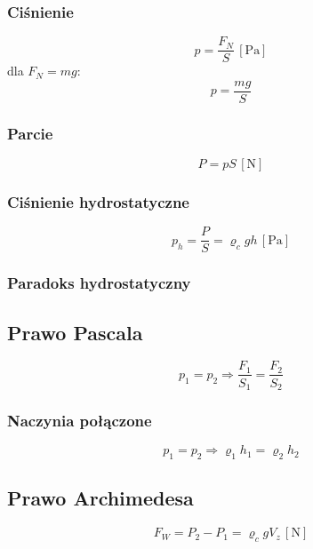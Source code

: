 \documentclass{article}
\numberwithin{equation}{section}
\newcommand{\unit}[1]{\, \left[\mathrm{#1}\right]}
\begin{document}
      \subsubsection{Ciśnienie}
        \begin{equation}
          p = \frac{F_N}{S} \unit{Pa}
        \end{equation}
        dla $F_N = mg$:
        \begin{equation}
          p = \frac{mg}{S}
        \end{equation}
      \subsubsection{Parcie}
        \begin{equation}
          P = pS \unit{N}
        \end{equation}
      \subsubsection{Ciśnienie hydrostatyczne}
        \begin{equation}
          p_h = \frac{P}{S} = \varrho_cgh \unit{Pa}
        \end{equation}
      \subsubsection{Paradoks hydrostatyczny}
    \subsection{Prawo Pascala}
      \begin{equation}
        p_1 = p_2 \Rightarrow \frac{F_1}{S_1} = \frac{F_2}{S_2}
      \end{equation}
      \subsubsection{Naczynia połączone}
        \begin{equation}
          p_1 = p_2 \Rightarrow \varrho_1h_1 = \varrho_2h_2
        \end{equation}
    \subsection{Prawo Archimedesa}
      \begin{equation}
        F_W = P_2 - P_1 = \varrho_cgV_z \unit{N}
      \end{equation}
\end{document}
